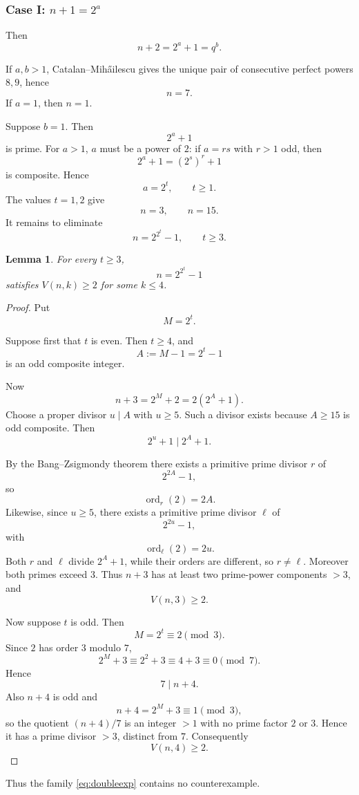 \documentclass[11pt]{article}
\newtheorem{lemma}[theorem]{Lemma}
\newcommand{\ord}{\operatorname{ord}}
\begin{document}
\subsubsection{Case I: \(n+1=2^a\)}

Then
\[
n+2=2^a+1=q^b.
\]

If \(a,b>1\), Catalan--Mih\H ailescu gives the unique pair of consecutive
perfect powers \(8,9\), hence
\[
n=7.
\]
If \(a=1\), then \(n=1\).

Suppose \(b=1\).  Then
\[
2^a+1
\]
is prime.  For \(a>1\), \(a\) must be a power of \(2\): if
\(a=rs\) with \(r>1\) odd, then
\[
2^a+1=(2^s)^r+1
\]
is composite.  Hence
\[
a=2^t,\qquad t\geq1.
\]
The values \(t=1,2\) give
\[
n=3,\qquad n=15.
\]
It remains to eliminate
\[
\boxed{
n=2^{2^t}-1,\qquad t\geq3.
}
\tag{8}\label{eq:doubleexp}
\]

\begin{lemma}\label{lem:doubleexp}
For every \(t\geq3\),
\[
n=2^{2^t}-1
\]
satisfies \(V(n,k)\geq2\) for some \(k\leq4\).
\end{lemma}

\begin{proof}
Put
\[
M=2^t.
\]

Suppose first that \(t\) is even.  Then \(t\geq4\), and
\[
A:=M-1=2^t-1
\]
is an odd composite integer.

Now
\[
n+3=2^M+2=2(2^{A}+1).
\]
Choose a proper divisor \(u\mid A\) with \(u\geq5\).  Such a divisor exists
because \(A\geq15\) is odd composite.  Then
\[
2^u+1\mid 2^A+1.
\]

By the Bang--Zsigmondy theorem there exists a primitive prime divisor
\(r\) of
\[
2^{2A}-1,
\]
so
\[
\ord_r(2)=2A.
\]
Likewise, since \(u\geq5\), there exists a primitive prime divisor
\(\ell\) of
\[
2^{2u}-1,
\]
with
\[
\ord_\ell(2)=2u.
\]
Both \(r\) and \(\ell\) divide \(2^A+1\), while their orders are different,
so \(r\neq\ell\).  Moreover both primes exceed \(3\).  Thus
\(n+3\) has at least two prime-power components \(>3\), and
\[
V(n,3)\geq2.
\]

Now suppose \(t\) is odd.  Then
\[
M=2^t\equiv2\pmod3.
\]
Since \(2\) has order \(3\) modulo \(7\),
\[
2^M+3\equiv2^2+3\equiv4+3\equiv0\pmod7.
\]
Hence
\[
7\mid n+4.
\]
Also \(n+4\) is odd and
\[
n+4=2^M+3\equiv1\pmod3,
\]
so the quotient \((n+4)/7\) is an integer \(>1\) with no prime factor
\(2\) or \(3\).  Hence it has a prime divisor \(>3\), distinct from \(7\).
Consequently
\[
V(n,4)\geq2.
\]
\end{proof}

Thus the family \eqref{eq:doubleexp} contains no counterexample.
\end{document}

